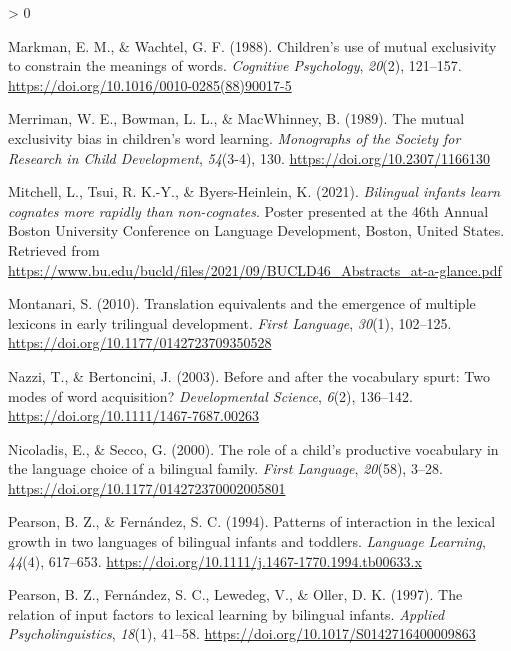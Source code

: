 \documentclass[
  english,
  ,man,floatsintext]{apa6}
\newlength{\cslhangindent}
\newenvironment{CSLReferences}[2] %
 {%
  \setlength{\parindent}{0pt}
  \ifodd #1 \everypar{\setlength{\hangindent}{\cslhangindent}}\ignorespaces\fi
  \ifnum #2 > 0
  \setlength{\parskip}{#2\baselineskip}
  \fi
 }%
 {}
\begin{document}
\begin{CSLReferences}{1}{0}
\leavevmode\hypertarget{ref-Markman_Wachtel_1988}{}%
Markman, E. M., \& Wachtel, G. F. (1988). Children's use of mutual exclusivity to constrain the meanings of words. \emph{Cognitive Psychology}, \emph{20}(2), 121--157. \url{https://doi.org/10.1016/0010-0285(88)90017-5}

\leavevmode\hypertarget{ref-Merriman_etal_1989}{}%
Merriman, W. E., Bowman, L. L., \& MacWhinney, B. (1989). The mutual exclusivity bias in children's word learning. \emph{Monographs of the Society for Research in Child Development}, \emph{54}(3-4), 130. \url{https://doi.org/10.2307/1166130}

\leavevmode\hypertarget{ref-Mitchell_etal_2021}{}%
Mitchell, L., Tsui, R. K.-Y., \& Byers-Heinlein, K. (2021). \emph{Bilingual infants learn cognates more rapidly than non-cognates}. Poster presented at the 46th Annual Boston University Conference on Language Development, Boston, United States. Retrieved from \url{https://www.bu.edu/bucld/files/2021/09/BUCLD46_Abstracts_at-a-glance.pdf}

\leavevmode\hypertarget{ref-Montanari_2010}{}%
Montanari, S. (2010). Translation equivalents and the emergence of multiple lexicons in early trilingual development. \emph{First Language}, \emph{30}(1), 102--125. \url{https://doi.org/10.1177/0142723709350528}

\leavevmode\hypertarget{ref-Nazzi_Bertoncini_2003}{}%
Nazzi, T., \& Bertoncini, J. (2003). Before and after the vocabulary spurt: Two modes of word acquisition? \emph{Developmental Science}, \emph{6}(2), 136--142. \url{https://doi.org/10.1111/1467-7687.00263}

\leavevmode\hypertarget{ref-Nicoladis_Secco_2000}{}%
Nicoladis, E., \& Secco, G. (2000). The role of a child's productive vocabulary in the language choice of a bilingual family. \emph{First Language}, \emph{20}(58), 3--28. \url{https://doi.org/10.1177/014272370002005801}

\leavevmode\hypertarget{ref-Pearson_Fernandez_1994}{}%
Pearson, B. Z., \& Fernández, S. C. (1994). Patterns of interaction in the lexical growth in two languages of bilingual infants and toddlers. \emph{Language Learning}, \emph{44}(4), 617--653. \url{https://doi.org/10.1111/j.1467-1770.1994.tb00633.x}

\leavevmode\hypertarget{ref-Pearson_etal_1997}{}%
Pearson, B. Z., Fernández, S. C., Lewedeg, V., \& Oller, D. K. (1997). The relation of input factors to lexical learning by bilingual infants. \emph{Applied Psycholinguistics}, \emph{18}(1), 41--58. \url{https://doi.org/10.1017/S0142716400009863}


\end{CSLReferences}
\end{document}
